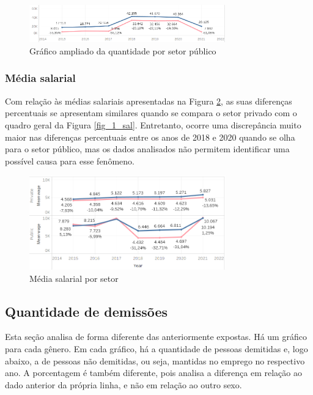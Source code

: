 \begin{figure}[htbp]
	\centerline{
		\includegraphics[width=85mm]{assets/3_1_qnt_pubpriv.PNG}
	}
	\caption{Gráfico ampliado da quantidade por setor público}
	\label{fig_3_1_qnt_pubpriv}
\end{figure}

\subsubsection{Média salarial}

Com relação às médias salariais apresentadas na Figura \ref{fig_3_sal_pubpriv}, as suas diferenças percentuais se apresentam similares quando se compara o setor privado com o quadro geral da Figura \ref{fig_1_sal}. Entretanto, ocorre uma discrepância muito maior nas diferenças percentuais entre os anos de 2018 e 2020 quando se olha para o setor público, mas os dados analisados não permitem identificar uma possível causa para esse fenômeno.

\begin{figure}[htbp]
	\centerline{
		\includegraphics[width=85mm]{assets/3_sal_pubpriv.PNG}
	}
	\caption{Média salarial por setor}
	\label{fig_3_sal_pubpriv}
\end{figure}

\subsection{Quantidade de demissões}

Esta seção analisa de forma diferente das anteriormente expostas. Há um gráfico para cada gênero. Em cada gráfico, há a quantidade de pessoas demitidas e, logo abaixo, a de pessoas não demitidas, ou seja, mantidas no emprego no respectivo ano. A porcentagem é também diferente, pois analisa a diferença em relação ao dado anterior da própria linha, e não em relação ao outro sexo.

